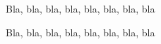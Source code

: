 \documentclass[12pt,a4paper]{article}
\begin{document}
\begin{docshowcase}
Bla, bla, bla, bla, bla, bla, bla, bla

Bla, bla, bla, bla, bla, bla, bla, bla
\end{docshowcase}
\end{document}
